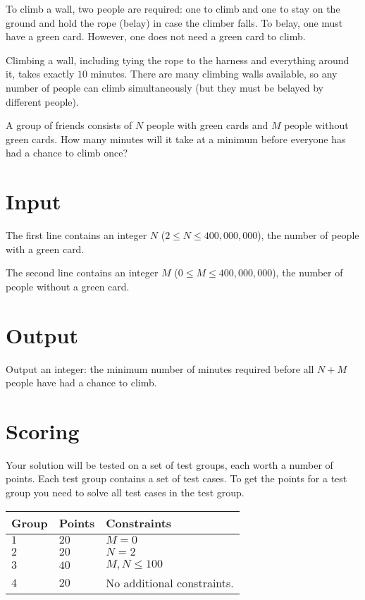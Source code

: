 \noindent
To climb a wall, two people are required: one to climb and one to stay on the ground and hold the rope (belay) in case the climber falls. To belay, one must have a green card. However, one does not need a green card to climb.

Climbing a wall, including tying the rope to the harness and everything around it, takes exactly $10$ minutes. There are many climbing walls available, so any number of people can climb simultaneously (but they must be belayed by different people).

A group of friends consists of $N$ people with green cards and $M$ people without green cards. How many minutes will it take at a minimum before everyone has had a chance to climb once?


\section*{Input}
The first line contains an integer $N$ ($2 \le N \le 400,000,000$), the number of people with a green card.

The second line contains an integer $M$ ($0 \le M \le 400,000,000$), the number of people without a green card.

\section*{Output}
Output an integer: the minimum number of minutes required before all $N + M$ people have had a chance to climb.

\section*{Scoring}
Your solution will be tested on a set of test groups, each worth a number of points. Each test group contains
a set of test cases. To get the points for a test group you need to solve all test cases in the test group.

\noindent
\begin{tabular}{| l | l | p{12cm} |}
  \hline
  \textbf{Group} & \textbf{Points} & \textbf{Constraints} \\ \hline
  $1$   & $20$        & $M = 0$ \\ \hline
  $2$   & $20$        & $N = 2$ \\ \hline
  $3$   & $40$        & $M, N \le 100$ \\ \hline
  $4$    & $20$        & No additional constraints. \\ \hline
\end{tabular}

